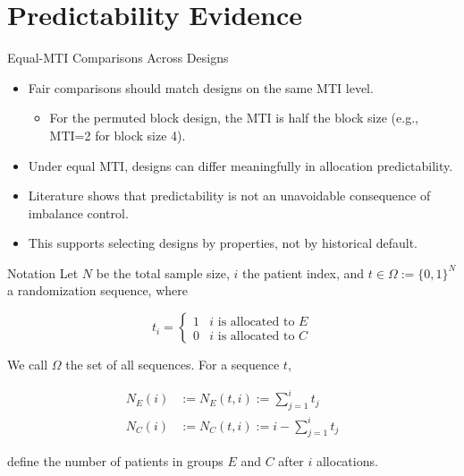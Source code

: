 \documentclass[
  11pt,
  ignorenonframetext,
  aspectratio=169,
]{beamer}
\providecommand{\tightlist}{%
  \setlength{\itemsep}{0pt}\setlength{\parskip}{0pt}}
\begin{document}
\hypertarget{predictability-evidence}{%
\section{Predictability Evidence}\label{predictability-evidence}}

\begin{frame}{Equal-MTI Comparisons Across Designs}
\protect\hypertarget{equal-mti-comparisons-across-designs}{}
\begin{itemize}
\tightlist
\item
  Fair comparisons should match designs on the same MTI level.

  \begin{itemize}
  \tightlist
  \item
    For the permuted block design, the MTI is half the block size (e.g.,
    MTI=2 for block size 4).
  \end{itemize}
\item
  Under equal MTI, designs can differ meaningfully in allocation
  predictability.
\item
  Literature shows that predictability is not an unavoidable consequence
  of imbalance control.
\item
  This supports selecting designs by properties, not by historical
  default.
\end{itemize}
\end{frame}

\begin{frame}{Notation}
\protect\hypertarget{notation}{}
Let \(N\) be the total sample size, \(i\) the patient index, and
\(t \in \Omega:=\{0,1\}^N\) a randomization sequence, where

\[
t_i = \begin{cases}
1 & i \text{ is allocated to } E\\
0 & i \text{ is allocated to } C
\end{cases}
\]

We call \(\Omega\) the set of all sequences. For a sequence \(t\),

\begin{align*}
N_E(i) &:= N_E(t,i) := \sum_{j=1}^i t_j \\
N_C(i) &:= N_C(t,i) := i - \sum_{j=1}^i t_j
\end{align*}

define the number of patients in groups \(E\) and \(C\) after \(i\)
allocations.
\end{frame}
\end{document}
